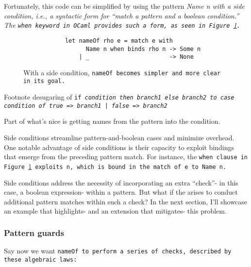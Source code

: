 \documentclass[manuscript,screen,review, 12pt]{acmart}
\begin{document}
\begin{outline}[enumerate]
    Fortunately, this code can be simplified by using the pattern \it{Name n}
    with a \it{side condition}, i.e., a syntactic form for “match a pattern
    \it{and} a boolean condition.” The \tt{when} keyword in OCaml
    provides such a form, as seen in Figure~\ref{fig:whennameof}.
        
        \begin{figure}[ht]
            \begin{verbatim}
            let nameOf rho e = match e with     
                  Name n when binds rho n -> Some n
                | _                       -> None  
                \end{verbatim}
            \caption{With a side condition, \tt{nameOf} becomes simpler and more
            clear in its goal.}
            \label{fig:whennameof}
        \end{figure}

        
    \3 Footnote desugaring of \tt{if} \it{condition} \tt{then} \it{branch1} \tt{else} \it{branch2} to \tt{case} \it{condition} \tt{of} \tt{true =>} \it{branch1} \tt{| false =>} \it{branch2}
    
    \3 Part of what's nice is getting names from the pattern into the condition. 

    Side conditions streamline pattern-and-boolean cases and minimize overhead.
    One notable advantage of side conditions is their capacity to exploit
    bindings that emerge from the preceding pattern match. For instance, the
    \tt{when} clause in Figure~\ref{fig:whennameof} exploits \tt{n}, which is
    bound in the match of \tt{e} to \tt{Name n}.

    Side conditions address the necessity of incorporating an extra “check”- in
    this case, a boolean expression- within a pattern. But what if the 
    arises to conduct additional pattern matches within such a check? In the
    next section, I'll showcase an example that highlights- and an extension
    that mitigates- this problem. 
    
    \subsubsection{Pattern guards}
    \label{guards}
    
    Say now we want \tt{nameOf} to perform a series of checks, described by
    these algebraic laws: 


\end{outline}
\end{document}
